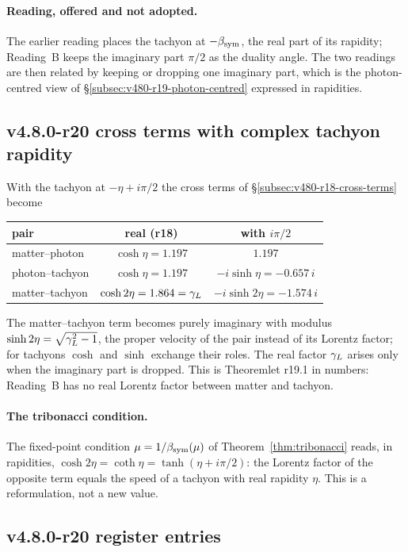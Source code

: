 \paragraph{Reading, offered and not adopted.}
The earlier reading places the tachyon at \(-\beta_{\mathrm{sym}}\), the real part of its rapidity; Reading~B keeps the imaginary part
\(\pi/2\) as the duality angle.  The two readings are then related by keeping or dropping one imaginary part, which is
the photon-centred view of \S\ref{subsec:v480-r19-photon-centred} expressed in rapidities.

\subsection*{v4.8.0-r20 cross terms with complex tachyon rapidity}
\label{subsec:v480-r20-cross-terms}

With the tachyon at \(-\eta+i\pi/2\) the cross terms of \S\ref{subsec:v480-r18-cross-terms} become
\begin{center}
\small
\begin{tabular}{@{}lcc@{}}
\toprule
pair & real (r18) & with \(i\pi/2\)\\
\midrule
matter--photon & \(\cosh\eta=1.197\) & \(1.197\)\\
photon--tachyon & \(\cosh\eta=1.197\) & \(-i\sinh\eta=-0.657\,i\)\\
matter--tachyon & \(\cosh2\eta=1.864=\gamma_L\) & \(-i\sinh2\eta=-1.574\,i\)\\
\bottomrule
\end{tabular}
\end{center}
The matter--tachyon term becomes purely imaginary with modulus \(\sinh2\eta=\sqrt{\gamma_L^2-1}\), the proper velocity of the
pair instead of its Lorentz factor; for tachyons \(\cosh\) and \(\sinh\) exchange their roles.  The real factor \(\gamma_L\)
arises only when the imaginary part is dropped.  This is Theoremlet r19.1 in numbers: Reading~B has no real Lorentz factor
between matter and tachyon.

\paragraph{The tribonacci condition.}
The fixed-point condition \(\mu=1/\beta_{\mathrm{sym}}(\mu)\) of Theorem~\ref{thm:tribonacci} reads, in rapidities,
\(\cosh2\eta=\coth\eta=\tanh(\eta+i\pi/2)\): the Lorentz factor of the opposite term equals the speed of a tachyon with
real rapidity \(\eta\).  This is a reformulation, not a new value.

\subsection*{v4.8.0-r20 register entries}
\label{subsec:v480-r20-register}

